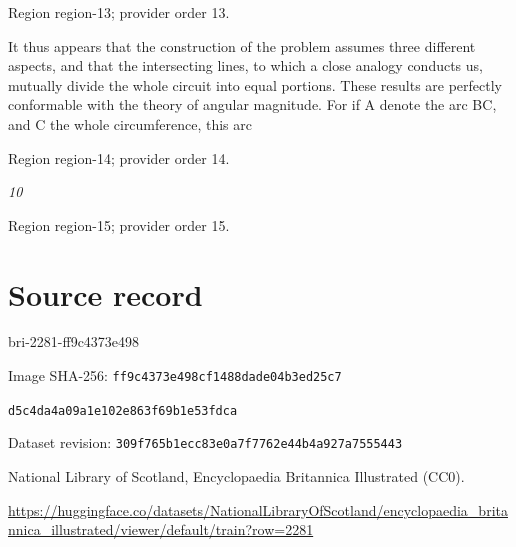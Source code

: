 \documentclass[11pt]{article}
\begin{document}
{\scriptsize\color{gray} Region region-13; provider order 13.\par}
\medskip

It thus appears that the construction of the problem assumes three different aspects, and that the intersecting lines, to which a close analogy conducts us, mutually divide the whole circuit into equal portions. These results are perfectly conformable with the theory of angular magnitude. For if A denote the arc BC, and C the whole circumference, this arc
\par

{\scriptsize\color{gray} Region region-14; provider order 14.\par}
\medskip

{\small\itshape 10\par}

{\scriptsize\color{gray} Region region-15; provider order 15.\par}
\medskip
\newpage\section*{Source record}
bri-2281-ff9c4373e498\par
Image SHA-256: \texttt{ff9c4373e498cf1488dade04b3ed25c7}\par\texttt{d5c4da4a09a1e102e863f69b1e53fdca}\par
Dataset revision: \texttt{309f765b1ecc83e0a7f7}\texttt{762e44b4a927a7555443}\par
National Library of Scotland, Encyclopaedia Britannica Illustrated (CC0).\par
\url{https://huggingface.co/datasets/NationalLibraryOfScotland/encyclopaedia_britannica_illustrated/viewer/default/train?row=2281}
\end{document}
